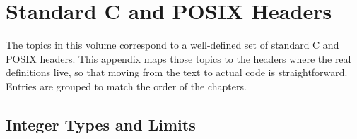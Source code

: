%
%

\appendix

\chapter{Standard C and POSIX Headers}
\label{app:headers}

\begin{chapterintro}
The topics in this volume correspond to a well-defined set of standard C
and POSIX headers. This appendix maps those topics to the headers where
the real definitions live, so that moving from the text to actual code is
straightforward. Entries are grouped to match the order of the chapters.
\end{chapterintro}

\section{Integer Types and Limits}


